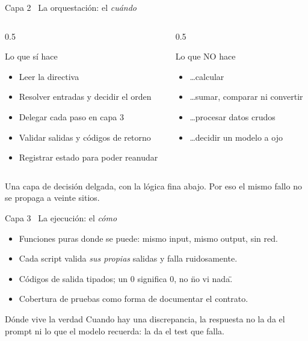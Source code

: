 \documentclass[aspectratio=169,11pt]{beamer}
\begin{document}
\begin{frame}{Capa 2 \textbullet\ La orquestación: el \emph{cuándo}}
  \begin{columns}[T]
    \begin{column}{0.5\textwidth}
      \begin{block}{Lo que sí hace}
        \begin{itemize}
          \item Leer la directiva
          \item Resolver entradas y decidir el orden
          \item Delegar cada paso en capa 3
          \item Validar salidas y códigos de retorno
          \item Registrar estado para poder reanudar
        \end{itemize}
      \end{block}
    \end{column}
    \begin{column}{0.5\textwidth}
      \begin{alertblock}{Lo que NO hace}
        \begin{itemize}
          \item \ldots calcular
          \item \ldots sumar, comparar ni convertir
          \item \ldots procesar datos crudos
          \item \ldots decidir un modelo a ojo
        \end{itemize}
      \end{alertblock}
    \end{column}
  \end{columns}
  \begin{panelRegla}
    Una capa de decisión delgada, con la lógica fina abajo.
    Por eso el mismo fallo no se propaga a veinte sitios.
  \end{panelRegla}
\end{frame}

\begin{frame}{Capa 3 \textbullet\ La ejecución: el \emph{cómo}}
  \begin{itemize}
    \item Funciones puras donde se puede: mismo input, mismo output, sin red.
    \item Cada script valida \emph{sus propias} salidas y falla ruidosamente.
    \item Códigos de salida tipados; un 0 significa 0, no \"no vi nada\".
    \item Cobertura de pruebas como forma de documentar el contrato.
  \end{itemize}
  \smallskip
  \begin{exampleblock}{Dónde vive la verdad}
    Cuando hay una discrepancia, la respuesta no la da el prompt ni lo que el
    modelo recuerda: la da el test que falla.
  \end{exampleblock}
\end{frame}
\end{document}
